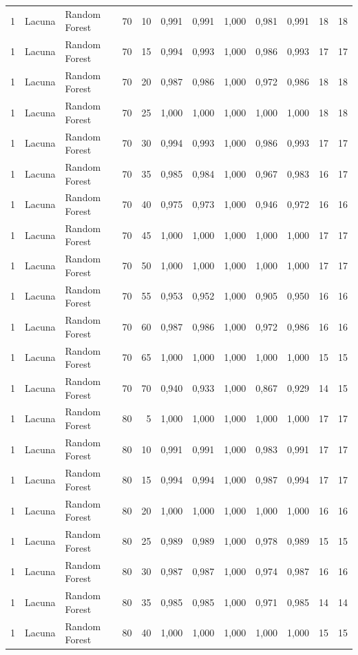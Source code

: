 \begin{longtable}{@{}rllrrrrrrrrr@{}}
1 & Lacuna & Random Forest & 70 & 10 & 0,991 & 0,991 & 1,000 & 0,981 & 0,991 & 18 & 18 \\
1 & Lacuna & Random Forest & 70 & 15 & 0,994 & 0,993 & 1,000 & 0,986 & 0,993 & 17 & 17 \\
1 & Lacuna & Random Forest & 70 & 20 & 0,987 & 0,986 & 1,000 & 0,972 & 0,986 & 18 & 18 \\
1 & Lacuna & Random Forest & 70 & 25 & 1,000 & 1,000 & 1,000 & 1,000 & 1,000 & 18 & 18 \\
1 & Lacuna & Random Forest & 70 & 30 & 0,994 & 0,993 & 1,000 & 0,986 & 0,993 & 17 & 17 \\
1 & Lacuna & Random Forest & 70 & 35 & 0,985 & 0,984 & 1,000 & 0,967 & 0,983 & 16 & 17 \\
1 & Lacuna & Random Forest & 70 & 40 & 0,975 & 0,973 & 1,000 & 0,946 & 0,972 & 16 & 16 \\
1 & Lacuna & Random Forest & 70 & 45 & 1,000 & 1,000 & 1,000 & 1,000 & 1,000 & 17 & 17 \\
1 & Lacuna & Random Forest & 70 & 50 & 1,000 & 1,000 & 1,000 & 1,000 & 1,000 & 17 & 17 \\
1 & Lacuna & Random Forest & 70 & 55 & 0,953 & 0,952 & 1,000 & 0,905 & 0,950 & 16 & 16 \\
1 & Lacuna & Random Forest & 70 & 60 & 0,987 & 0,986 & 1,000 & 0,972 & 0,986 & 16 & 16 \\
1 & Lacuna & Random Forest & 70 & 65 & 1,000 & 1,000 & 1,000 & 1,000 & 1,000 & 15 & 15 \\
1 & Lacuna & Random Forest & 70 & 70 & 0,940 & 0,933 & 1,000 & 0,867 & 0,929 & 14 & 15 \\
1 & Lacuna & Random Forest & 80 & 5 & 1,000 & 1,000 & 1,000 & 1,000 & 1,000 & 17 & 17 \\
1 & Lacuna & Random Forest & 80 & 10 & 0,991 & 0,991 & 1,000 & 0,983 & 0,991 & 17 & 17 \\
1 & Lacuna & Random Forest & 80 & 15 & 0,994 & 0,994 & 1,000 & 0,987 & 0,994 & 17 & 17 \\
1 & Lacuna & Random Forest & 80 & 20 & 1,000 & 1,000 & 1,000 & 1,000 & 1,000 & 16 & 16 \\
1 & Lacuna & Random Forest & 80 & 25 & 0,989 & 0,989 & 1,000 & 0,978 & 0,989 & 15 & 15 \\
1 & Lacuna & Random Forest & 80 & 30 & 0,987 & 0,987 & 1,000 & 0,974 & 0,987 & 16 & 16 \\
1 & Lacuna & Random Forest & 80 & 35 & 0,985 & 0,985 & 1,000 & 0,971 & 0,985 & 14 & 14 \\
1 & Lacuna & Random Forest & 80 & 40 & 1,000 & 1,000 & 1,000 & 1,000 & 1,000 & 15 & 15 \\

\end{longtable}
